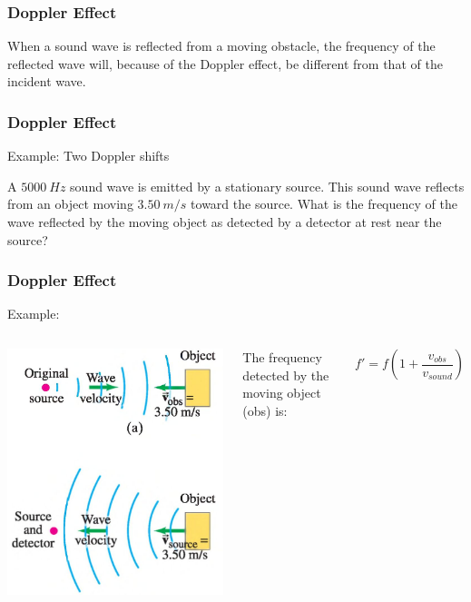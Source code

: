 \documentclass[]{beamer}
\begin{document}

\begin{frame}
\frametitle{Doppler Effect}


When a sound wave is reflected from a moving obstacle, the frequency of the
reflected wave will, because of the Doppler effect, be different from that of
the incident wave.



  \end{frame}



\begin{frame}
\frametitle{Doppler Effect}

Example: Two Doppler shifts \pause

\vspace{3mm}

A $5000~Hz$ sound wave is emitted by a
stationary source. This sound wave reflects from an object moving $3.50~m/s$
toward the source. What is the frequency of the wave reflected by
the moving object as detected by a detector at rest near the source?                                                              




  \end{frame}




\begin{frame}
\frametitle{Doppler Effect}

Example: 

\vspace{3mm}

   \begin{columns}[c]
   \column{2in}  %
  \begin{center}
  \includegraphics[height=2.in]{images4/doppler7.jpg}
\end{center}


  
   \column{2in}
\pause
The frequency detected by the moving object (obs) is:

\begin{equation*}
f'= f\left(1+\frac{v_{obs}}{v_{sound}}\right)
\end{equation*}




   \end{columns}




  \end{frame}
\end{document}

